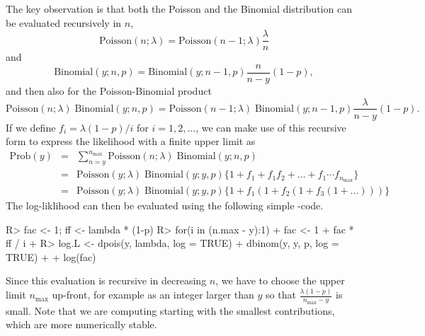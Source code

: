 \documentclass[article]{jss}
\begin{document}
The key observation is that both the Poisson and the Binomial distribution can be evaluated recursively in $n$,
\begin{displaymath}
    \text{Poisson}(n; \lambda) = \text{Poisson}(n-1; \lambda) \frac{\lambda}{n}
\end{displaymath}
and
\begin{displaymath}
    \text{Binomial}(y; n, p) = \text{Binomial}(y; n-1, p) \frac{n}{n-y}(1-p),
\end{displaymath}
and then also for the Poisson-Binomial product
\begin{displaymath}
    \text{Poisson}(n ; \lambda) \; \text{Binomial}(y;  n, p)
    =
    \text{Poisson}(n-1; \lambda) \; \text{Binomial}(y; n-1, p)
    \frac{\lambda}{n-y}(1-p).
\end{displaymath}
If we define $f_i = \lambda(1-p)/i$ for $i=1, 2, \ldots$, we can make use of this recursive form to express the likelihood with a finite upper limit as
\begin{eqnarray}
    \text{Prob}(y) &=& \sum_{n = y}^{n_{\text{max}}}
                       \text{Poisson}(n ; \lambda)\;
                      \text{Binomial}(y;  n, p) \nonumber\\
                   &=& \text{Poisson}(y; \lambda)\; \text{Binomial}(y; y, p)
                       \Big\{ 1 + f_1 + f_1f_2 +
                    \ldots
                      +f_1\cdots f_{n_\text{max}}
                       \Big\} \nonumber\\
                   &=& \text{Poisson}(y; \lambda)\; \text{Binomial}(y; y, p)
                       \Big\{ 1 + f_1(1+f_2(1+f_3(1+ \dots)))\Big\}\nonumber
\end{eqnarray}
The log-liklihood can then be evaluated using the following simple -code.
\begin{CodeInput}
R> fac <- 1; ff <- lambda * (1-p)
R> for(i in (n.max - y):1){
+    fac <- 1 + fac * ff / i
+  } 
R> log.L <- dpois(y, lambda, log = TRUE) + dbinom(y, y, p, log = TRUE) + 
+           log(fac)
\end{CodeInput}
Since this evaluation is recursive in decreasing $n$, we have to choose the upper limit $n_\text{max}$ up-front, for example as an integer larger than $y$ so that $\frac{\lambda (1-p)}{n_\text{max}-y}$ is small. Note that we are computing  starting with the smallest contributions, which are more numerically stable.
\end{document}
